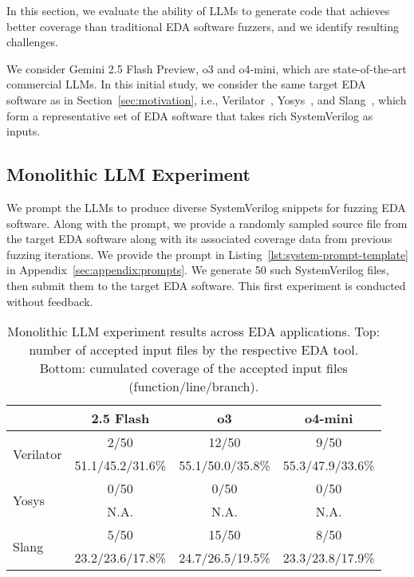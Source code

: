 In this section, we evaluate the ability of LLMs to generate code that achieves better coverage than traditional EDA software fuzzers, and we identify resulting challenges.

We consider Gemini 2.5 Flash Preview, o3 and o4-mini, which are state-of-the-art commercial LLMs.
In this initial study, we consider the same target EDA software as in Section~\ref{sec:motivation}, i.e.,
Verilator~\cite{Snyder2024Verilator}, Yosys~\cite{wolf2013yosys}, and Slang~\cite{popoloski2019slang}, which form a representative set of EDA software that takes rich SystemVerilog as inputs.

\subsection{Monolithic LLM Experiment}
\label{sec:llms:monolithic-llm}

We prompt the LLMs to produce diverse SystemVerilog snippets for fuzzing EDA software.
Along with the prompt, we provide a randomly sampled source file from the target EDA software along with its associated coverage data from previous fuzzing iterations.
We provide the prompt in Listing~\ref{lst:system-prompt-template} in Appendix~\ref{sec:appendix:prompts}.
We generate 50 such SystemVerilog files, then submit them to the target EDA software.
This first experiment is conducted without feedback.

\begin{table}[t]
    \centering
    \caption{Monolithic LLM experiment results across EDA applications. Top: number of accepted input files by the respective EDA tool. Bottom: cumulated coverage of the accepted input files (function/line/branch).}
    \label{tab:monolithic-llm-results}
    \small
    \begin{tabular}{|l|c|c|c|}
        \hline
        \rowcolor{gray!10} %
        \textbf{} & \textbf{2.5 Flash} & \textbf{o3}      & \textbf{o4-mini} \\
        \hline
        \multirow{2}{*}{Verilator}
                  & 2/50               & 12/50            & 9/50             \\
                  & 51.1/45.2/31.6\%   & 55.1/50.0/35.8\% & 55.3/47.9/33.6\% \\
        \hline
        \multirow{2}{*}{Yosys}
                  & 0/50               & 0/50             & 0/50             \\
                  & N.A.            & N.A.          & N.A.          \\
        \hline
        \multirow{2}{*}{Slang}
                  & 5/50               & 15/50            & 8/50             \\
                  & 23.2/23.6/17.8\%   & 24.7/26.5/19.5\% & 23.3/23.8/17.9\% \\
        \hline
    \end{tabular}
\end{table}


